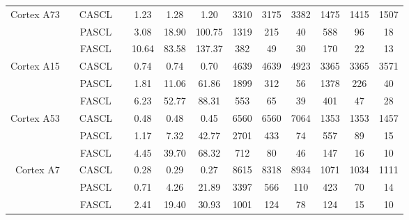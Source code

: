 \begin{table}[ht]
{{\begin{tabular}{r|c|c|c c c c| c c c| c c c}
      \hline
      \multirow{3}{*}{\begin{minipage}{0.5in}\centering Cortex A73\end{minipage}} & \multirow{3}{*}{\begin{minipage}{0.5in}\centering 2360\end{minipage}} 
        & CASCL &                     &  1.23  & 1.28   & 1.20   & 3310 & 3175 & 3382 & 1475 & 1415 & 1507 \\
      & & PASCL &                     &  3.08  & 18.90  & 100.75 & 1319 & 215  & 40   & 588  & 96   & 18   \\
      & & FASCL &                     &  10.64 & 83.58  & 137.37 & 382  & 49   & 30   & 170  & 22   & 13   \\

      \hline
      \multirow{3}{*}{\begin{minipage}{0.5in}\centering Cortex A15\end{minipage}} & \multirow{3}{*}{\begin{minipage}{0.5in}\centering 2000\end{minipage}} 
        & CASCL &                     &  0.74  & 0.74   & 0.70   & 4639 & 4639 & 4923 & 3365 & 3365 & 3571 \\
      & & PASCL &                     &  1.81  & 11.06  & 61.86  & 1899 & 312  & 56   & 1378 & 226  & 40   \\
      & & FASCL &                     &  6.23  & 52.77  & 88.31  & 553  & 65   & 39   & 401  & 47   & 28   \\

      \hline
      \multirow{3}{*}{\begin{minipage}{0.5in}\centering Cortex A53\end{minipage}} & \multirow{3}{*}{\begin{minipage}{0.5in}\centering 1840\end{minipage}} 
        & CASCL &                     &  0.48  & 0.48   & 0.45   & 6560 & 6560 & 7064 & 1353 & 1353 & 1457 \\
      & & PASCL &                     &  1.17  & 7.32   & 42.77  & 2701 & 433  & 74   & 557  & 89   & 15   \\
      & & FASCL &                     &  4.45  & 39.70  & 68.32  & 712  & 80   & 46   & 147  & 16   & 10   \\

      \hline
      \multirow{3}{*}{\begin{minipage}{0.5in}\centering Cortex A7\end{minipage}} & \multirow{3}{*}{\begin{minipage}{0.5in}\centering 1400\end{minipage}} 
        & CASCL &                     &  0.28  & 0.29   & 0.27   & 8615 & 8318 & 8934 & 1071 & 1034 & 1111 \\
      & & PASCL &                     &  0.71  & 4.26   & 21.89  & 3397 & 566  & 110  & 423  & 70   & 14   \\
      & & FASCL &                     &  2.41  & 19.40  & 30.93  & 1001 & 124  & 78   & 124  & 15   & 10   \\


\end{tabular}}}
\end{table}
